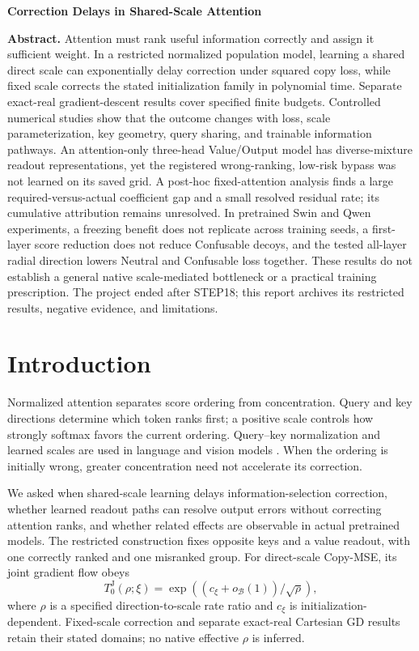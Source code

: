 \documentclass[10pt,a4paper]{article}
\newcommand{\B}{\mathcal B}
\newcommand{\J}{\mathrm J}
\begin{document}
\begin{center}
{\fontsize{17}{20}\selectfont\bfseries Correction Delays in Shared-Scale Attention}\par
\vspace{4pt}{\small Munsik Kim}\par
\vspace{4pt}{\small Archived research report --- v0.6-archive --- 8 October 2026}
\end{center}
\vspace{3pt}
\noindent\textbf{Abstract.}
Attention must rank useful information correctly and assign it sufficient weight. In a restricted normalized population model, learning a shared direct scale can exponentially delay correction under squared copy loss, while fixed scale corrects the stated initialization family in polynomial time. Separate exact-real gradient-descent results cover specified finite budgets. Controlled numerical studies show that the outcome changes with loss, scale parameterization, key geometry, query sharing, and trainable information pathways. An attention-only three-head Value/Output model has diverse-mixture readout representations, yet the registered wrong-ranking, low-risk bypass was not learned on its saved grid. A post-hoc fixed-attention analysis finds a large required-versus-actual coefficient gap and a small resolved residual rate; its cumulative attribution remains unresolved. In pretrained Swin and Qwen experiments, a freezing benefit does not replicate across training seeds, a first-layer score reduction does not reduce Confusable decoys, and the tested all-layer radial direction lowers Neutral and Confusable loss together. These results do not establish a general native scale-mediated bottleneck or a practical training prescription. The project ended after STEP18; this report archives its restricted results, negative evidence, and limitations.

\section{Introduction}
Normalized attention separates score ordering from concentration. Query and key directions determine which token ranks first; a positive scale controls how strongly softmax favors the current ordering. Query--key normalization and learned scales are used in language and vision models \cite{henry2020,liu2022}. When the ordering is initially wrong, greater concentration need not accelerate its correction.

We asked when shared-scale learning delays information-selection correction, whether learned readout paths can resolve output errors without correcting attention ranks, and whether related effects are observable in actual pretrained models. The restricted construction fixes opposite keys and a value readout, with one correctly ranked and one misranked group. For direct-scale Copy-MSE, its joint gradient flow obeys
\[
T_0^\J(\rho;\xi)=\exp\!\left((c_\xi+o_{\B}(1))/\sqrt{\rho}\right),
\]
where $\rho$ is a specified direction-to-scale rate ratio and $c_\xi$ is initialization-dependent. Fixed-scale correction and separate exact-real Cartesian GD results retain their stated domains; no native effective $\rho$ is inferred.
\end{document}
